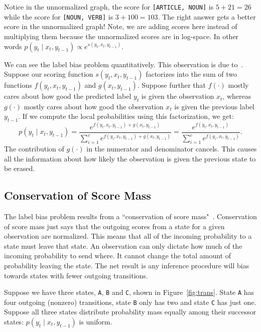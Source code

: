 \documentclass[11pt, letterpaper]{article}
\begin{document}
Notice in the unnormalized graph, the score for \texttt{[ARTICLE, NOUN]} is $5 + 21 =
26$ while the score for \texttt{[NOUN, VERB]} is $3 + 100 = 103$. The right answer
gets a better score in the unnormalized graph! Note, we are adding scores here
instead of multiplying them because the unnormalized scores are in log-space.
In other words $p(y_t \mid x_t, y_{t-1}) \propto e^{s(y_t, x_t, y_{t-1})}$.

We can see the label bias problem quantitatively. This observation is due
to~\citet{denker1994}. Suppose our scoring function $s(y_t, x_t, y_{t-1})$
factorizes into the sum of two functions $f(y_t, x_t, y_{t-1})$ and $g(x_t,
y_{t-1})$. Suppose further that $f(\cdot)$ mostly cares about how good the
predicted label $y_t$ is given the observation $x_t$, whereas $g(\cdot)$ mostly
cares about how good the observation $x_t$ is given the previous label
$y_{t-1}$. If we compute the local probabilities using this factorization, we
get:
\begin{equation}
p(y_t \mid x_t, y_{t-1}) =
    \frac{e^{f(y_t, x_t, y_{t-1}) + g(x_t, y_{t-1})}}{
        \sum_{i=1}^c e^{f(y_i, x_t, y_{t-1}) + g(x_t, y_{t-1})}}
     = \frac{e^{f(y_t, x_t, y_{t-1})}}{\sum_{i=1}^c e^{f(y_i, x_t, y_{t-1})}}.
\end{equation}
The contribution of $g(\cdot)$ in the numerator and denominator cancels. This
causes all the information about how likely the observation is given the
previous state to be erased.


\subsection{Conservation of Score Mass}

The label bias problem results from a ``conservation of score
mass"~\citep{bottou1991}.  Conservation of score mass just says that the
outgoing scores from a state for a given observation are normalized. This means
that all of the incoming probability to a state must leave that state. An
observation can only dictate how much of the incoming probability to send
where. It cannot change the total amount of probability leaving the state. The
net result is any inference procedure will bias towards states with fewer
outgoing transitions.

Suppose we have three states, \texttt{A}, \texttt{B} and \texttt{C}, shown
in Figure~\ref{fig:trans}. State \texttt{A} has four outgoing (nonzero) transitions, state
\texttt{B} only has two and state \texttt{C} has just one. Suppose all three
states distribute probability mass equally among their successor states: $p(y_t
\mid x_t, y_{t-1})$ is uniform.
\end{document}
